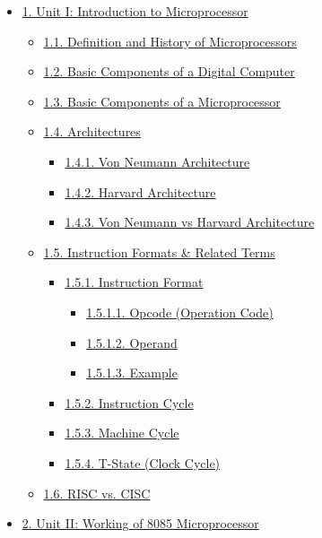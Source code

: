 \documentclass[
]{article}
\author{}
\date{}
\begin{document}
\begin{itemize}
\item
  \protect\hyperlink{1-unit-i-introduction-to-microprocessor}{1. Unit I:
  Introduction to Microprocessor}

  \begin{itemize}
  \item
    \protect\hyperlink{11-definition-and-history-of-microprocessors}{1.1.
    Definition and History of Microprocessors}
  \item
    \protect\hyperlink{12-basic-components-of-a-digital-computer}{1.2.
    Basic Components of a Digital Computer}
  \item
    \protect\hyperlink{13-basic-components-of-a-microprocessor}{1.3.
    Basic Components of a Microprocessor}
  \item
    \protect\hyperlink{14-architectures}{1.4. Architectures}

    \begin{itemize}
    \item
      \protect\hyperlink{141-von-neumann-architecture}{1.4.1. Von
      Neumann Architecture}
    \item
      \protect\hyperlink{142-harvard-architecture}{1.4.2. Harvard
      Architecture}
    \item
      \protect\hyperlink{143-von-neumann-vs-harvard-architecture}{1.4.3.
      Von Neumann vs Harvard Architecture}
    \end{itemize}
  \item
    \protect\hyperlink{15-instruction-formats--related-terms}{1.5.
    Instruction Formats \& Related Terms}

    \begin{itemize}
    \item
      \protect\hyperlink{151-instruction-format}{1.5.1. Instruction
      Format}

      \begin{itemize}
      \item
        \protect\hyperlink{1511-opcode-operation-code}{1.5.1.1. Opcode
        (Operation Code)}
      \item
        \protect\hyperlink{1512-operand}{1.5.1.2. Operand}
      \item
        \protect\hyperlink{1513-example}{1.5.1.3. Example}
      \end{itemize}
    \item
      \protect\hyperlink{152-instruction-cycle}{1.5.2. Instruction
      Cycle}
    \item
      \protect\hyperlink{153-machine-cycle}{1.5.3. Machine Cycle}
    \item
      \protect\hyperlink{154-t-state-clock-cycle}{1.5.4. T-State (Clock
      Cycle)}
    \end{itemize}
  \item
    \protect\hyperlink{16-risc-vs-cisc}{1.6. RISC vs. CISC}
  \end{itemize}
\item
  \protect\hyperlink{2-unit-ii-working-of-8085-microprocessor}{2. Unit
  II: Working of 8085 Microprocessor}


\end{itemize}
\end{document}
